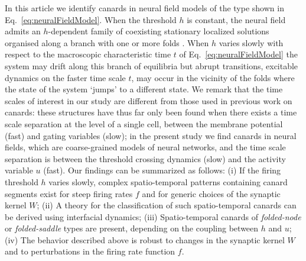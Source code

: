 \documentclass[aps,prl,reprint,superscriptaddress]{revtex4-1}
\newcommand{\edits}[1]{#1}
\begin{document}
In this article we identify canards in neural field models of
the type shown in Eq.~\eqref{eq:neuralFieldModel}. When the threshold 
$h$ is constant, the neural field admits an $h$-dependent family of
coexisting stationary localized solutions organised along a branch
with one or more folds \cite{Laing2002aa,Coombes2003aa}. When $h$ varies slowly
with respect to the macroscopic characteristic time $t$ of
Eq.~\eqref{eq:neuralFieldModel} the system may drift along this branch of equilibria
but abrupt transitions, \edits{excitable} dynamics on the faster time scale $t$, may
occur in the vicinity of the folds where the state of the system `jumps' to a
different state. We remark that the time scales of interest in our study are
different from those used in previous work on canards: these structures have thus far
only been found when there exists a time scale separation at the level of a single cell,
between the membrane potential (fast) and gating variables (slow); in the present
study we find canards in neural fields, which are coarse-grained models of neural
networks, and the time scale separation is between the threshold crossing dynamics
(slow) and the activity variable $u$ (fast).  Our findings can be summarized as
follows: (i) If the firing threshold $h$ varies slowly, complex
spatio-temporal patterns containing canard segments exist for steep
firing rates $f$ and for generic choices of the synaptic kernel $W$;
(ii) A theory for the classification of such spatio-temporal canards
can be derived using interfacial dynamics; (iii) Spatio-temporal
canards of \emph{folded-node} or \emph{folded-saddle} types are
present, depending on the coupling between $h$ and $u$; 
(iv) The behavior described above is robust to changes in the synaptic
kernel $W$ and to perturbations in the firing rate function $f$.
\end{document}
